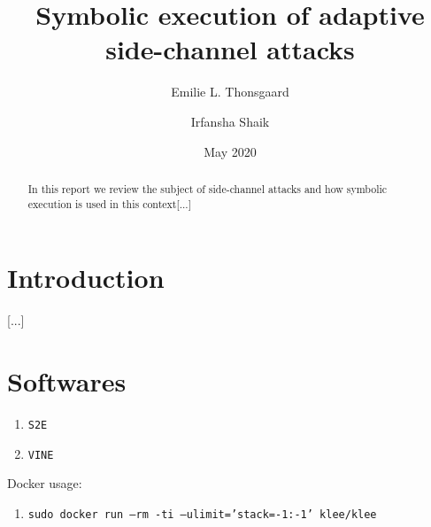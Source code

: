 \documentclass[11pt,a4paper,notitlepage]{article}
\title{Symbolic execution of adaptive side-channel attacks}
\author{Emilie L. Thonsgaard \and Irfansha Shaik}
\date{May 2020}
\begin{document}
\begin{titlingpage}
    \maketitle
    \begin{abstract}
        In this report we review the subject of side-channel attacks and how symbolic execution is used in this context[...]
    \end{abstract}
\end{titlingpage}

\tableofcontents
\newpage






\section{Introduction}
\label{cha:introduction}

[...]

\newpage

\section{Softwares}
\label{cha:softwares}

\begin{enumerate}
    \item \texttt{S2E}
    \item \texttt{VINE}
\end{enumerate}

Docker usage:
\begin{enumerate}
    \item \texttt{sudo docker run --rm -ti --ulimit='stack=-1:-1' klee/klee}
\end{enumerate}
\end{document}
